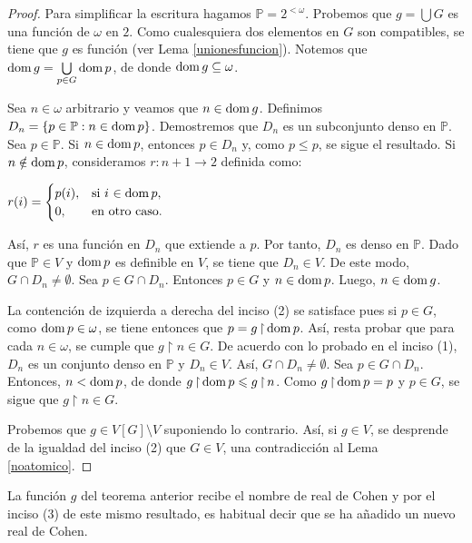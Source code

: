 \documentclass[11pt]{unam_tesis1}
\theoremstyle{MyThmStyle}
\theoremstyle{definition}
\theoremstyle{plain}
\theoremstyle{remark}
\def\dom{\mathop{\rm dom}\nolimits}
\def\rest{\mathop{\upharpoonright}\nolimits}
\let\leq\leqslant
\begin{document}
\begin{proof}
Para simplificar la escritura hagamos $\mathbb P=2^{<\omega}$. Probemos que $g=\bigcup G$ es una funci\'on de $\omega$ en $2$. Como cualesquiera dos elementos en $G$ son compatibles, se tiene que $g$ es funci\'on (ver Lema \ref{unionesfuncion}). Notemos que $\dom g=\bigcup\limits_{p\in G} \dom p$, de donde $\dom g\subseteq \omega$.

Sea $n\in \omega$ arbitrario y veamos que $n\in \dom g$. Definimos $D_n=\{p\in \mathbb P:n\in \dom p \}$. Demostremos que $D_n$ es un subconjunto denso en $\mathbb P$. Sea $p\in \mathbb P$. Si $n\in \dom p$, entonces $p\in D_n$ y, como $p\leq p$, se sigue el resultado. Si $n\notin \dom p$, consideramos $r:n+1\to 2$ definida como:

\begin{center}
$r(i) = \begin{cases} p(i), & \mbox{si } i\mbox{  $\in \dom p$}, \\ 0, & \mbox{en otro caso}. \end{cases}$
\end{center}

As\'i, $r$ es una funci\'on en $D_n$ que extiende a $p$. Por tanto, $D_n$ es denso en $\mathbb P$. Dado que $\mathbb P\in V$ y $\dom p$ es definible en $V$, se tiene que $D_n\in V$. De este modo, $G\cap D_n\neq \emptyset$. Sea $p\in G\cap D_n$. Entonces $p\in G$ y $n\in \dom p$. Luego, $n\in \dom g$.

La contenci\'on de izquierda a derecha del inciso (2) se satisface pues si $p\in G$, como $\dom p\in \omega$, se tiene entonces que $p=g\rest \dom p$. As\'i, resta probar que para cada $n\in \omega $, se cumple que $g\rest n\in G$. De acuerdo con lo probado en el inciso (1), $D_n$ es un conjunto denso en $\mathbb P$ y $D_n\in V$. As\'i, $G\cap D_n\neq \emptyset$. Sea $p\in G\cap D_n$. Entonces, $n<\dom p$, de donde $g\rest \dom p\leq g\rest n$. Como $g\rest \dom p=p$ y $p\in G$, se sigue que $g\rest n\in G$.

Probemos que $g\in V[G]\setminus V$ suponiendo lo contrario. As\'i, si $g\in V$, se desprende de la igualdad del inciso (2) que $G\in V$, una contradicci\'on al Lema \ref{noatomico}.
\end{proof}
La funci\'on $g$ del teorema anterior recibe el nombre de real de Cohen y por el inciso (3) de este mismo resultado, es habitual decir que se ha a\~nadido un nuevo real de Cohen.
\end{document}
